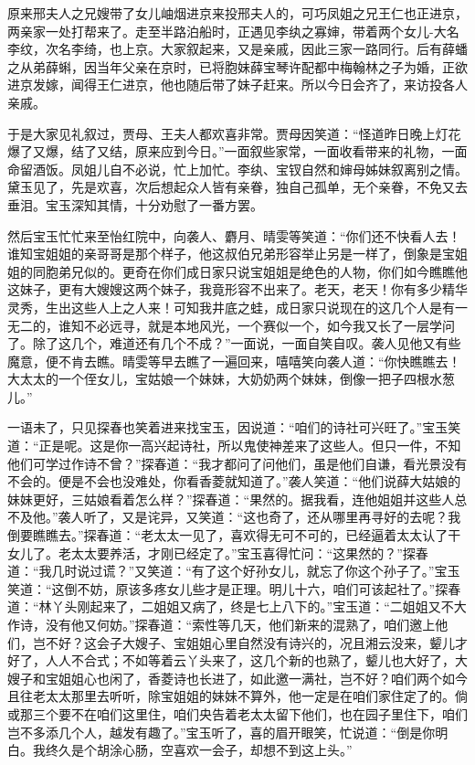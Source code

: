 \documentclass[12pt,oneside]{book}
\begin{document}
原来邢夫人之兄嫂带了女儿岫烟进京来投邢夫人的，可巧凤姐之兄王仁也正进京，两亲家一处打帮来了。走至半路泊船时，正遇见李纨之寡婶，带着两个女儿-大名李纹，次名李绮，也上京。大家叙起来，又是亲戚，因此三家一路同行。后有薛蟠之从弟薛蝌，因当年父亲在京时，已将胞妹薛宝琴许配都中梅翰林之子为婚，正欲进京发嫁，闻得王仁进京，他也随后带了妹子赶来。所以今日会齐了，来访投各人亲戚。

于是大家见礼叙过，贾母、王夫人都欢喜非常。贾母因笑道：“怪道昨日晚上灯花爆了又爆，结了又结，原来应到今日。”一面叙些家常，一面收看带来的礼物，一面命留酒饭。凤姐儿自不必说，忙上加忙。李纨、宝钗自然和婶母姊妹叙离别之情。黛玉见了，先是欢喜，次后想起众人皆有亲眷，独自己孤单，无个亲眷，不免又去垂泪。宝玉深知其情，十分劝慰了一番方罢。

然后宝玉忙忙来至怡红院中，向袭人、麝月、晴雯等笑道：“你们还不快看人去！谁知宝姐姐的亲哥哥是那个样子，他这叔伯兄弟形容举止另是一样了，倒象是宝姐姐的同胞弟兄似的。更奇在你们成日家只说宝姐姐是绝色的人物，你们如今瞧瞧他这妹子，更有大嫂嫂这两个妹子，我竟形容不出来了。老天，老天！你有多少精华灵秀，生出这些人上之人来！可知我井底之蛙，成日家只说现在的这几个人是有一无二的，谁知不必远寻，就是本地风光，一个赛似一个，如今我又长了一层学问了。除了这几个，难道还有几个不成？”一面说，一面自笑自叹。袭人见他又有些魔意，便不肯去瞧。晴雯等早去瞧了一遍回来，嘻嘻笑向袭人道：“你快瞧瞧去！大太太的一个侄女儿，宝姑娘一个妹妹，大奶奶两个妹妹，倒像一把子四根水葱儿。”

一语未了，只见探春也笑着进来找宝玉，因说道：“咱们的诗社可兴旺了。”宝玉笑道：“正是呢。这是你一高兴起诗社，所以鬼使神差来了这些人。但只一件，不知他们可学过作诗不曾？”探春道：“我才都问了问他们，虽是他们自谦，看光景没有不会的。便是不会也没难处，你看香菱就知道了。”袭人笑道：“他们说薛大姑娘的妹妹更好，三姑娘看着怎么样？”探春道：“果然的。据我看，连他姐姐并这些人总不及他。”袭人听了，又是诧异，又笑道：“这也奇了，还从哪里再寻好的去呢？我倒要瞧瞧去。”探春道：“老太太一见了，喜欢得无可不可的，已经逼着太太认了干女儿了。老太太要养活，才刚已经定了。”宝玉喜得忙问：“这果然的？”探春道：“我几时说过谎？”又笑道：“有了这个好孙女儿，就忘了你这个孙子了。”宝玉笑道：“这倒不妨，原该多疼女儿些才是正理。明儿十六，咱们可该起社了。”探春道：“林丫头刚起来了，二姐姐又病了，终是七上八下的。”宝玉道：“二姐姐又不大作诗，没有他又何妨。”探春道：“索性等几天，他们新来的混熟了，咱们邀上他们，岂不好？这会子大嫂子、宝姐姐心里自然没有诗兴的，况且湘云没来，颦儿才好了，人人不合式；不如等着云丫头来了，这几个新的也熟了，颦儿也大好了，大嫂子和宝姐姐心也闲了，香菱诗也长进了，如此邀一满社，岂不好？咱们两个如今且往老太太那里去听听，除宝姐姐的妹妹不算外，他一定是在咱们家住定了的。倘或那三个要不在咱们这里住，咱们央告着老太太留下他们，也在园子里住下，咱们岂不多添几个人，越发有趣了。”宝玉听了，喜的眉开眼笑，忙说道：“倒是你明白。我终久是个胡涂心肠，空喜欢一会子，却想不到这上头。”
\end{document}
